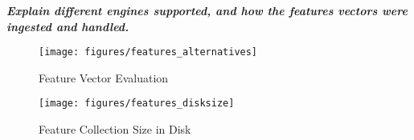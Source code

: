 \textbf{\textit{Explain different engines supported, and how the features vectors
were ingested and handled.}}

\begin{figure*}[]
\centering
\texttt{[image: figures/features\_alternatives]}
\caption{Feature Vector Evaluation}
\label{fig:features_eval}
\end{figure*}

\begin{figure*}[]
\centering
\texttt{[image: figures/features\_disksize]}
\caption{Feature Collection Size in Disk}
\label{fig:features_size_does_matter}
\end{figure*}
